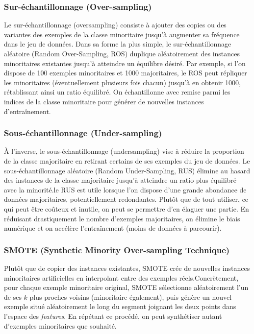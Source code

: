 \documentclass[a4paper,12pt]{article}
\begin{document}
\subsubsection{Sur-échantillonnage (Over-sampling)}

Le sur-échantillonnage (oversampling) consiste à ajouter des copies ou des variantes des exemples de
la classe minoritaire jusqu’à augmenter sa fréquence dans le jeu de données. Dans sa forme la plus
simple, le sur-échantillonnage aléatoire (Random Over-Sampling, ROS) duplique aléatoirement des
instances minoritaires existantes jusqu’à atteindre un équilibre désiré. Par exemple, si l’on dispose
de 100 exemples minoritaires et 1000 majoritaires, le ROS peut répliquer les minoritaires
(éventuellement plusieurs fois chacun) jusqu’à en obtenir 1000, rétablissant ainsi un ratio équilibré. On échantillonne avec remise parmi les indices de la classe minoritaire pour
générer de nouvelles instances d’entraînement.

\subsubsection{Sous-échantillonnage (Under-sampling)}

À l’inverse, le sous-échantillonnage (undersampling) vise à réduire la proportion de la classe
majoritaire en retirant certains de ses exemples du jeu de données. Le sous-échantillonnage aléatoire
(Random Under-Sampling, RUS) élimine au hasard des instances de la classe majoritaire jusqu’à atteindre
un ratio plus équilibré avec la minorité.le RUS est utile lorsque l’on dispose d’une grande abondance de
données majoritaires, potentiellement redondantes. Plutôt que de tout utiliser, ce qui peut être
coûteux et inutile, on peut se permettre d’en élaguer une partie. En réduisant drastiquement le nombre
d’exemples majoritaires, on élimine le biais numérique et on accélère l’entraînement (moins de
données à parcourir).

\subsubsection{SMOTE (Synthetic Minority Over-sampling Technique)}



Plutôt que de copier des instances existantes,
SMOTE crée de nouvelles instances minoritaires artificielles en interpolant entre des exemples réels.Concrètement, pour chaque exemple minoritaire original, SMOTE sélectionne aléatoirement l’un de ses
$k$ plus proches voisins (minoritaire également), puis génère un nouvel exemple situé aléatoirement le
long du segment joignant les deux points dans l’espace des \textit{features}. En répétant ce procédé, on
peut synthétiser autant d’exemples minoritaires que souhaité.
\end{document}
